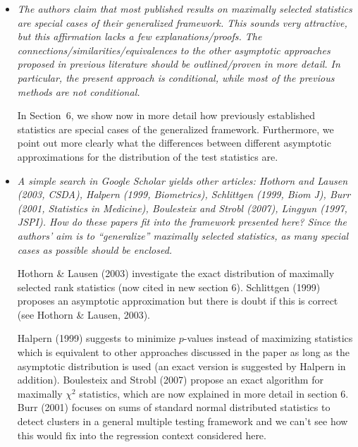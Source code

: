 \documentclass[11pt,a4paper]{article}
\begin{document}
\begin{itemize}

  \item \textit{The authors claim that most published results on maximally selected
        statistics are special cases of their generalized framework. This sounds very
	attractive, but this affirmation lacks a few explanations/proofs. The
        connections/similarities/equivalences to the other asymptotic approaches
        proposed in previous literature should be outlined/proven in more detail. In
        particular, the present approach is conditional, while most of the previous
        methods are not conditional.}
	
	In Section~6, we show now in more detail how previously established statistics
	are special cases of the generalized framework. Furthermore, we point out 
	more clearly what the differences between different asymptotic approximations
	for the distribution of the test statistics are.
	
  \item \textit{A simple search in Google Scholar yields other articles: Hothorn and
        Lausen (2003, CSDA), Halpern (1999, Biometrics), Schlittgen (1999, Biom J),
	Burr (2001, Statistics in Medicine), Boulesteix and Strobl (2007),
	Lingyun (1997, JSPI). How do these papers fit into the framework presented here?
	Since the authors' aim is to ``generalize'' maximally selected statistics, as
	many special cases as possible should be enclosed.}
	
        Hothorn \& Lausen (2003) investigate the exact distribution of maximally
        selected rank statistics (now cited in new section 6). Schlittgen (1999)
        proposes an asymptotic approximation but there is doubt if this
        is correct (see Hothorn \& Lausen, 2003). 

        Halpern (1999) suggests to minimize $p$-values instead of maximizing 
        statistics which is equivalent to other approaches discussed in the paper 
        as long as the asymptotic distribution is used (an exact version is suggested 
        by Halpern in addition).
        Boulesteix and Strobl (2007) propose an exact algorithm for maximally
        $\chi^2$ statistics, which are now explained in more detail in section 6.
        Burr (2001) focuses on sums of standard normal distributed statistics
        to detect clusters in a general multiple testing framework 
        and we can't see how this would fix into 
        the regression context considered here.
	

\end{itemize}
\end{document}
